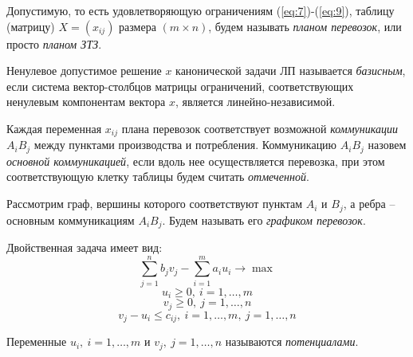\begin{definition}
	Допустимую, то есть удовлетворяющую ограничениям (\ref{eq:7})-(\ref{eq:9}), таблицу (матрицу) $X = (x_{ij})$ размера $(m \times n)$, будем называть \emph{планом перевозок}, или просто \emph{планом ЗТЗ}.
\end{definition}

\begin{definition}
	Ненулевое допустимое решение $x$ канонической задачи ЛП называется \emph{базисным}, если система вектор-столбцов матрицы ограничений, соответствующих ненулевым компонентам вектора $x$, является линейно-независимой.
\end{definition}

\begin{definition}
	Каждая переменная $x_{ij} $ плана перевозок соответствует возможной \emph{коммуникации} $A_iB_j$ между пунктами производства и потребления. Коммуникацию $A_iB_j$ назовем \emph{основной коммуникацией}, если вдоль нее осуществляется перевозка, при этом соответствующую клетку таблицы будем считать \emph{отмеченной}.
\end{definition}

\begin{definition}
	Рассмотрим граф, вершины которого соответствуют пунктам $A_i$ и $B_j$, а ребра -- основным коммуникациям $A_iB_j$. Будем называть его \emph{графиком перевозок}.
\end{definition}

Двойственная задача имеет вид:
\begin{equation}\label{eq:11}
	\sum_{j=1}^{n} b_jv_j - \sum_{i=1}^{m} a_iu_i \rightarrow \max
\end{equation}
\begin{equation}\label{eq:12}
	u_i \geqslant 0, \ i = 1,\ldots ,m
\end{equation}
\begin{equation}\label{eq:13}
	v_j \geqslant 0, \ j = 1,\ldots ,n
\end{equation}
\begin{equation}\label{eq:14}
	v_j - u_i \leqslant c_{ij}, \ i=1,\ldots ,m, \ j=1,\ldots ,n
\end{equation}

\begin{definition}[Потенциалы]
	Переменные $u_i, \ i=1,\ldots ,m$ и $v_j, \ j = 1,\ldots ,n$ называются \emph{потенциалами}.
\end{definition}

